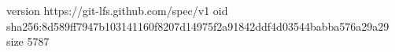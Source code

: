 version https://git-lfs.github.com/spec/v1
oid sha256:8d589ff7947b103141160f8207d14975f2a91842ddf4d03544babba576a29a29
size 5787
